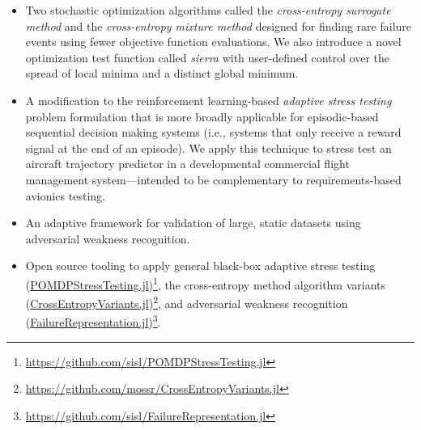 \begin{itemize}
    \item Two stochastic optimization algorithms called the \textit{cross-entropy surrogate method} and the \textit{cross-entropy mixture method} designed for finding rare failure events using fewer objective function evaluations. We also introduce a novel optimization test function called \textit{sierra} with user-defined control over the spread of local minima and a distinct global minimum.

    \item A modification to the reinforcement learning-based \textit{adaptive stress testing} problem formulation that is more broadly applicable for episodic-based sequential decision making systems (i.e., systems that only receive a reward signal at the end of an episode). We apply this technique to stress test an aircraft trajectory predictor in a developmental commercial flight management system---intended to be complementary to requirements-based avionics testing.

    \item An adaptive framework for validation of large, static datasets using adversarial weakness recognition.

    \item Open source tooling to apply general black-box adaptive stress testing (\href{https://github.com/sisl/POMDPStressTesting.jl}{POMDPStressTesting.jl})\footnote{\url{https://github.com/sisl/POMDPStressTesting.jl}}, the cross-entropy method algorithm variants (\href{https://github.com/mossr/CrossEntropyVariants.jl}{CrossEntropyVariants.jl})\footnote{\url{https://github.com/mossr/CrossEntropyVariants.jl}}, and adversarial weakness recognition (\href{https://github.com/sisl/FailureRepresentation.jl}{FailureRepresentation.jl})\footnote{\url{https://github.com/sisl/FailureRepresentation.jl}}.
\end{itemize}






